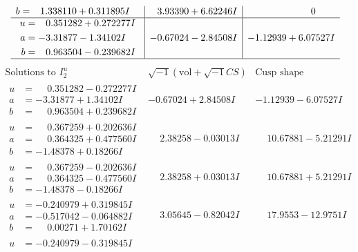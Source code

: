 \documentclass[1p]{elsarticle_modified}
\theoremstyle{definition}
\newcommand{\I}{\sqrt{-1}}
\begin{document}
$$\begin{array}{c|c|c}
\begin{aligned}
b &= \phantom{-}1.338110 + 0.311895 I\end{aligned}
 & \phantom{-}3.93390 + 6.62246 I & \phantom{-0.000000 } 0 \\ \hline\begin{aligned}
u &= \phantom{-}0.351282 + 0.272277 I \\
a &= -3.31877 - 1.34102 I \\
b &= \phantom{-}0.963504 - 0.239682 I\end{aligned}
 & -0.67024 - 2.84508 I & -1.12939 + 6.07527 I\\
 \hline 
 \end{array}$$\newpage$$\begin{array}{c|c|c}  
\text{Solutions to }I^u_{2}& \I (\text{vol} + \sqrt{-1}CS) & \text{Cusp shape}\\
 \hline 
\begin{aligned}
u &= \phantom{-}0.351282 - 0.272277 I \\
a &= -3.31877 + 1.34102 I \\
b &= \phantom{-}0.963504 + 0.239682 I\end{aligned}
 & -0.67024 + 2.84508 I & -1.12939 - 6.07527 I \\ \hline\begin{aligned}
u &= \phantom{-}0.367259 + 0.202636 I \\
a &= \phantom{-}0.364325 + 0.477560 I \\
b &= -1.48378 + 0.18266 I\end{aligned}
 & \phantom{-}2.38258 - 0.03013 I & \phantom{-}10.67881 - 5.21291 I \\ \hline\begin{aligned}
u &= \phantom{-}0.367259 - 0.202636 I \\
a &= \phantom{-}0.364325 - 0.477560 I \\
b &= -1.48378 - 0.18266 I\end{aligned}
 & \phantom{-}2.38258 + 0.03013 I & \phantom{-}10.67881 + 5.21291 I \\ \hline\begin{aligned}
u &= -0.240979 + 0.319845 I \\
a &= -0.517042 - 0.064882 I \\
b &= \phantom{-}0.00271 + 1.70162 I\end{aligned}
 & \phantom{-}3.05645 - 0.82042 I & \phantom{-}17.9553 - 12.9751 I \\ \hline\begin{aligned}
u &= -0.240979 - 0.319845 I \\

\end{aligned}
\end{array}$$
\end{document}
